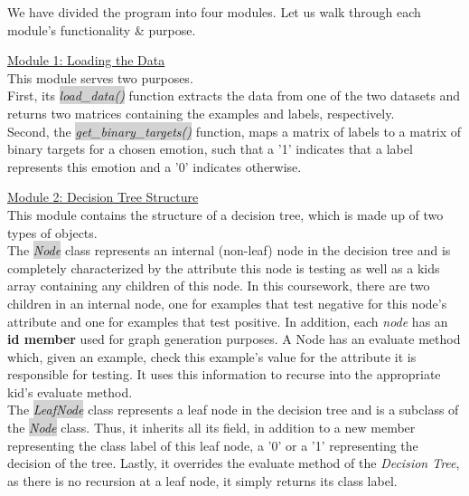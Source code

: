 We have divided the program into four modules. Let us walk through each module's functionality \& purpose.

\underline{Module 1: Loading the Data} \\
This module serves two purposes.\\
First, its  \colorbox{lightgray}{\emph{load\_data()}} function extracts the data from one of the two datasets
and returns two matrices containing the examples and labels, respectively. \\
Second, the  \colorbox{lightgray}{\emph{get\_binary\_targets()}} function, maps a matrix of labels to a matrix of binary targets for a chosen emotion,
such that a '1' indicates that a label represents this emotion and a '0' indicates otherwise.

{\underline{Module 2: Decision Tree Structure} \\
This module contains the structure of a decision tree, which is made up of two types of objects. \\
The  \colorbox{lightgray}{\emph{Node}} class represents an internal (non-leaf) node in the decision tree and is completely characterized by the attribute
this node is testing as well as a kids array containing any children of this node. In this coursework, there are two children
in an internal node, one for examples that test negative for this node's attribute and one for examples that test positive.
In addition, each \emph{node} has an \textbf{id member} used for graph generation purposes.
A Node has an evaluate method which, given an example, check this example's value for the attribute it is responsible for testing.
It uses this information to recurse into the appropriate kid's evaluate method. \\
The  \colorbox{lightgray}{\emph{LeafNode}} class represents a leaf node in the decision tree and is a subclass of the  \colorbox{lightgray}{\emph{Node}} class.
Thus, it inherits all its field, in addition to a new member representing the class label of this leaf node,
a '0' or a '1' representing the decision of the tree.
Lastly, it overrides the evaluate method of the \emph{Decision Tree}, as there is no recursion at a leaf node, it simply returns its class label.\\


}
